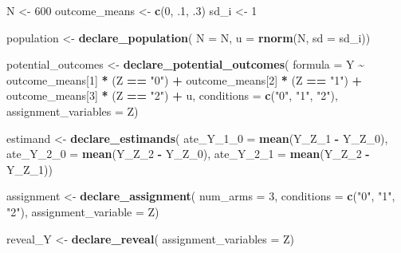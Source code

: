 \documentclass[]{article}
\newenvironment{Shaded}{\begin{snugshade}}{\end{snugshade}}
\newcommand{\DataTypeTok}[1]{\textcolor[rgb]{0.13,0.29,0.53}{#1}}
\newcommand{\DecValTok}[1]{\textcolor[rgb]{0.00,0.00,0.81}{#1}}
\newcommand{\FloatTok}[1]{\textcolor[rgb]{0.00,0.00,0.81}{#1}}
\newcommand{\KeywordTok}[1]{\textcolor[rgb]{0.13,0.29,0.53}{\textbf{#1}}}
\newcommand{\NormalTok}[1]{#1}
\newcommand{\OperatorTok}[1]{\textcolor[rgb]{0.81,0.36,0.00}{\textbf{#1}}}
\newcommand{\StringTok}[1]{\textcolor[rgb]{0.31,0.60,0.02}{#1}}
\begin{document}
\begin{Shaded}
\begin{Highlighting}[]
\NormalTok{N <{-}}\StringTok{ }\DecValTok{600}
\NormalTok{outcome\_means <{-}}\StringTok{ }\KeywordTok{c}\NormalTok{(}\DecValTok{0}\NormalTok{, }\FloatTok{.1}\NormalTok{, }\FloatTok{.3}\NormalTok{)}
\NormalTok{sd\_i <{-}}\StringTok{ }\DecValTok{1}

\NormalTok{population <{-}}\StringTok{ }\KeywordTok{declare\_population}\NormalTok{(}
  \DataTypeTok{N =}\NormalTok{ N, }\DataTypeTok{u =} \KeywordTok{rnorm}\NormalTok{(N, }\DataTypeTok{sd =}\NormalTok{ sd\_i))}

\NormalTok{potential\_outcomes <{-}}\StringTok{ }\KeywordTok{declare\_potential\_outcomes}\NormalTok{(}
  \DataTypeTok{formula =}\NormalTok{ Y }\OperatorTok{\textasciitilde{}}\StringTok{ }\NormalTok{outcome\_means[}\DecValTok{1}\NormalTok{] }\OperatorTok{*}\StringTok{ }\NormalTok{(Z }\OperatorTok{==}\StringTok{ "0"}\NormalTok{) }\OperatorTok{+}
\StringTok{    }\NormalTok{outcome\_means[}\DecValTok{2}\NormalTok{] }\OperatorTok{*}\StringTok{ }\NormalTok{(Z }\OperatorTok{==}\StringTok{ "1"}\NormalTok{) }\OperatorTok{+}
\StringTok{    }\NormalTok{outcome\_means[}\DecValTok{3}\NormalTok{] }\OperatorTok{*}\StringTok{ }\NormalTok{(Z }\OperatorTok{==}\StringTok{ "2"}\NormalTok{) }\OperatorTok{+}\StringTok{ }\NormalTok{u,}
  \DataTypeTok{conditions =} \KeywordTok{c}\NormalTok{(}\StringTok{"0"}\NormalTok{, }\StringTok{"1"}\NormalTok{, }\StringTok{"2"}\NormalTok{),}
  \DataTypeTok{assignment\_variables =}\NormalTok{ Z)}

\NormalTok{estimand <{-}}\StringTok{ }\KeywordTok{declare\_estimands}\NormalTok{(}
  \DataTypeTok{ate\_Y\_1\_0 =} \KeywordTok{mean}\NormalTok{(Y\_Z\_}\DecValTok{1} \OperatorTok{{-}}\StringTok{ }\NormalTok{Y\_Z\_}\DecValTok{0}\NormalTok{),}
  \DataTypeTok{ate\_Y\_2\_0 =} \KeywordTok{mean}\NormalTok{(Y\_Z\_}\DecValTok{2} \OperatorTok{{-}}\StringTok{ }\NormalTok{Y\_Z\_}\DecValTok{0}\NormalTok{),}
  \DataTypeTok{ate\_Y\_2\_1 =} \KeywordTok{mean}\NormalTok{(Y\_Z\_}\DecValTok{2} \OperatorTok{{-}}\StringTok{ }\NormalTok{Y\_Z\_}\DecValTok{1}\NormalTok{))}

\NormalTok{assignment <{-}}\StringTok{ }\KeywordTok{declare\_assignment}\NormalTok{(}
  \DataTypeTok{num\_arms =} \DecValTok{3}\NormalTok{,}
  \DataTypeTok{conditions =} \KeywordTok{c}\NormalTok{(}\StringTok{"0"}\NormalTok{, }\StringTok{"1"}\NormalTok{, }\StringTok{"2"}\NormalTok{),}
  \DataTypeTok{assignment\_variable =}\NormalTok{ Z)}

\NormalTok{reveal\_Y <{-}}\StringTok{ }\KeywordTok{declare\_reveal}\NormalTok{(}
  \DataTypeTok{assignment\_variables =}\NormalTok{ Z)}


\end{Highlighting}
\end{Shaded}
\end{document}
